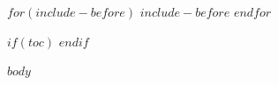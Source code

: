 \documentclass[11pt]{article}
\begin{document}
$for(include-before)$
$include-before$
$endfor$

$if(toc)$
\newpage
\tableofcontents
\newpage
$endif$

$body$
\end{document}
